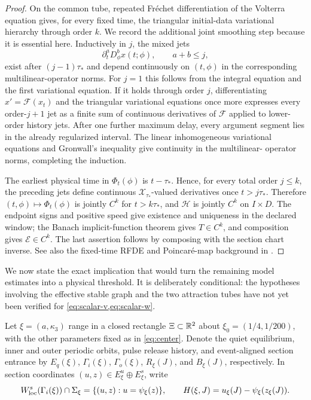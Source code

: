 \begin{proof}
On the common tube, repeated Fr\'echet differentiation of the Volterra
equation gives, for every fixed time, the triangular initial-data
variational hierarchy through order \(k\).  We record the additional joint
smoothing step because it is essential here.  Inductively in \(j\), the
mixed jets
\[
 \partial_t^aD_\phi^b x(t;\phi),
 \qquad a+b\le j,
\]
exist after \((j-1)\tau_*\) and depend continuously on \((t,\phi)\) in the
corresponding multilinear-operator norms.  For \(j=1\) this follows from the
integral equation and the first variational equation.  If it holds through
order \(j\), differentiating \(x'=\mathcal F(x_t)\) and the triangular
variational equations once more expresses every order-\(j+1\) jet as a
finite sum of continuous derivatives of \(\mathcal F\) applied to lower-order
history jets.  After one further maximum delay, every argument segment lies
in the already regularized interval.  The linear inhomogeneous variational
equations and Gronwall's inequality give continuity in the multilinear-
operator norms, completing the induction.

The earliest physical time in \(\Phi_t(\phi)\) is \(t-\tau_*\).  Hence, for
every total order \(j\le k\), the preceding jets define continuous
\(\mathcal X_{\tau_*}\)-valued derivatives once \(t>j\tau_*\).  Therefore
\((t,\phi)\mapsto\Phi_t(\phi)\) is jointly \(C^k\) for \(t>k\tau_*\), and
\(\mathcal H\) is jointly \(C^k\) on \(I\times D\).  The endpoint signs and
positive speed give existence and uniqueness in the declared window; the
Banach implicit-function theorem gives \(T\in C^k\), and composition gives
\(\mathcal E\in C^k\).  The last assertion follows by composing with the
section chart inverse.  See also the fixed-time RFDE and Poincar\'e-map
background in \citet[Chs.~VII.4 and XIV.3]{diekmann1995delay}.
\end{proof}

We now state the exact implication that would turn the remaining model
estimates into a physical threshold.  It is deliberately conditional: the
hypotheses involving the effective stable graph and the two attraction tubes
have not yet been verified for \cref{eq:scalar-v,eq:scalar-w}.

Let \(\xi=(a,\kappa_3)\) range in a closed rectangle
\(\Xi\subset\mathbb R^2\) about \(\xi_0=(1/4,1/200)\), with the other parameters
fixed as in \cref{eq:center}.  Denote the quiet equilibrium, inner and outer
periodic orbits, pulse release history, and event-aligned section entrance by
\(E_q(\xi)\), \(\Gamma_i(\xi)\), \(\Gamma_o(\xi)\), \(R_\xi(J)\), and
\(B_\xi(J)\), respectively.  In section coordinates
\((u,z)\in E^u_\xi\oplus E^s_\xi\), write
\begin{equation}
 W^s_{\rm loc}(\Gamma_i(\xi))\cap\Sigma_\xi
 =\{(u,z):u=\psi_\xi(z)\},
 \qquad
 H(\xi,J)=u_\xi(J)-\psi_\xi(z_\xi(J)).                 \label{eq:parametric-pulse-gap}
\end{equation}

